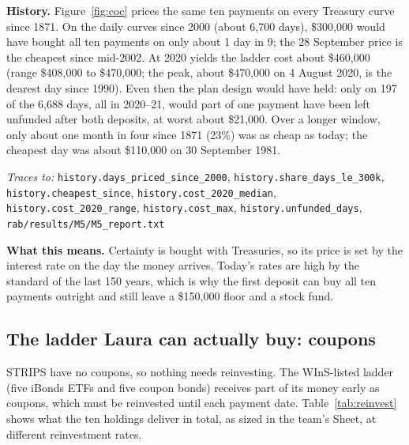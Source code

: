 \documentclass[11pt,a4paper]{article}
\newcommand{\nk}[1]{{\urlstyle{tt}\nolinkurl{#1}}}
\newcommand{\src}[1]{{\urlstyle{tt}\nolinkurl{#1}}}
\newcommand{\keys}[1]{\par{\footnotesize\raggedright\color{black!60}\textit{Traces to:} #1\par}}
\begin{document}
\textbf{History.} Figure~\ref{fig:coc} prices the same ten payments on every Treasury curve since 1871. On the daily
curves since 2000 (about 6,700 days), \$300,000 would have bought all ten payments on only about 1 day in 9; the
28 September price is the cheapest since mid-2002. At 2020 yields the ladder cost about \$460,000 (range \$408,000 to
\$470,000; the peak, about \$470,000 on 4 August 2020, is the dearest day since 1990). Even then the plan design
would have held: only on 197 of the 6,688 days, all in 2020--21, would part of one payment have been left unfunded
after both deposits, at worst about \$21,000. Over a longer window, only about one month in four since 1871
(23\%) was as cheap as today; the cheapest day was about \$110,000 on 30 September 1981.
\keys{\nk{history.days_priced_since_2000}, \nk{history.share_days_le_300k}, \nk{history.cheapest_since},
\nk{history.cost_2020_median}, \nk{history.cost_2020_range}, \nk{history.cost_max}, \nk{history.unfunded_days},
\src{rab/results/M5/M5_report.txt}}

\textbf{What this means.} Certainty is bought with Treasuries, so its price is set by the interest rate on the day
the money arrives. Today's rates are high by the standard of the last 150 years, which is why the first deposit can
buy all ten payments outright and still leave a \$150,000 floor and a stock fund.

\subsection{The ladder Laura can actually buy: coupons}\label{sec:coupons}

STRIPS have no coupons, so nothing needs reinvesting. The WInS-listed ladder (five iBonds ETFs and five coupon bonds)
receives part of its money early as coupons, which must be reinvested until each payment date. Table~\ref{tab:reinvest}
shows what the ten holdings deliver in total, as sized in the team's Sheet, at different reinvestment rates.
\end{document}
